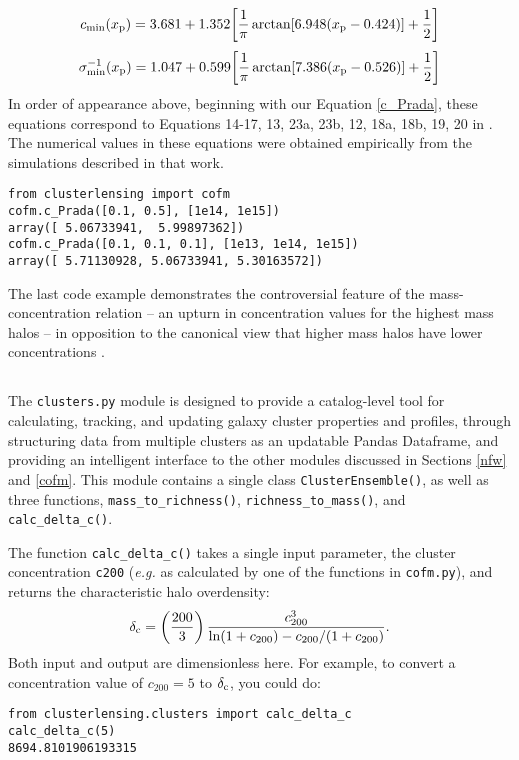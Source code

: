 \documentclass{emulateapj}
\newcommand{\code}{\lstinline[style=codeintext]}
\newcommand{\hcode}{\large\normalfont\texttt} %
\begin{document}
\begin{equation}
c_{\rm min}(x_{\rm p}) = 3.681 + 1.352 \bigg[ \frac{1}{\pi} \arctan[6.948 (x_{\rm p} - 0.424)] + \frac{1}{2} \bigg]
\end{equation}
\begin{equation}
\sigma^{-1}_{\rm min}(x_{\rm p}) = 1.047 + 0.599 \bigg[ \frac{1}{\pi} \arctan[7.386 (x_{\rm p} - 0.526)] + \frac{1}{2} \bigg]
\end{equation}
In order of appearance above, beginning with our Equation \ref{c_Prada}, these equations correspond to Equations 14-17, 13, 23a, 23b, 12, 18a, 18b, 19, 20 in \citet{Prada12}. The numerical values in these equations were obtained empirically from the simulations described in that work.
\begin{lstlisting}
from clusterlensing import cofm
cofm.c_Prada([0.1, 0.5], [1e14, 1e15])
array([ 5.06733941,  5.99897362])
cofm.c_Prada([0.1, 0.1, 0.1], [1e13, 1e14, 1e15])
array([ 5.71130928, 5.06733941, 5.30163572])
\end{lstlisting}
The last code example demonstrates the controversial feature of the \citet{Prada12} mass-concentration relation -- an upturn in concentration values for the highest mass halos -- in opposition to the canonical view that higher mass halos have lower concentrations \citep{nfw96, nfw97, Jing00, Bullock01}.



\subsection{\normalfont{\hcode{clusters.py}}}
\label{clusters}
The \code{clusters.py} module is designed to provide a catalog-level tool for calculating, tracking, and updating galaxy cluster properties and profiles, through structuring data from multiple clusters as an updatable Pandas Dataframe, and providing an intelligent interface to the other modules discussed in Sections \ref{nfw} and \ref{cofm}. This module contains a single class \code{ClusterEnsemble()}, as well as three functions, \code{mass_to_richness()}, \code{richness_to_mass()}, and \code{calc_delta_c()}.

The function \code{calc_delta_c()} takes a single input parameter, the cluster concentration \code{c200} (\emph{e.g.} as calculated by one of the functions in \code{cofm.py}), and returns the characteristic halo overdensity:
\begin{equation}
\delta_{\rm c} = \left( \frac{200}{3} \right) \frac{c_{200}^3}{\ln(1 + c_{200}) - c_{200}/(1 + c_{200})}.
\end{equation}
Both input and output are dimensionless here. For example, to convert a concentration value of $c_{200} = 5$ to $\delta_{\rm c}$, you could do:
\begin{lstlisting}
from clusterlensing.clusters import calc_delta_c
calc_delta_c(5)
8694.8101906193315
\end{lstlisting}
\end{document}
